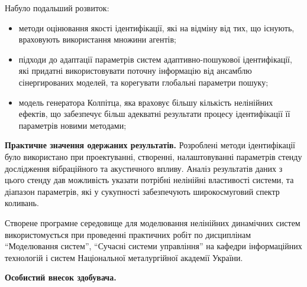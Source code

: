 \documentclass[a4paper,13pt]{atuaref}
\begin{document}
\noindent
Набуло подальший розвиток:
\begin{itemize}

  \item
  методи оцінювання якості ідентифікації,
  які на відміну від тих, що існують,
  враховують використання множини агентів;

  \item
  підходи до адаптації параметрів систем
  адаптивно-пошукової ідентифікації, які придатні використовувати поточну
  інформацію від ансамблю сінергированих моделей, та корегувати глобальні
  параметри пошуку;

  \item
    модель генератора Колпітца, яка враховує
    більшу кількість нелінійних ефектів,
    що забезпечує більш адекватні результати процесу
    ідентифікації її параметрів новими методами;

\end{itemize}


\smallskip
\textbf{Практичне значення одержаних результатів.}
Розроблені методи ідентифікації було використано
при проектуванні, створенні, налаштовуванні параметрів
стенду дослідження вібраційного та акустичного впливу.
Аналіз результатів даних з цього стенду
дав можливість указати потрібні нелінійні властивості системи,
та діапазон параметрів, які у сукупності
забезпечують широкосмуговий спектр коливань.

Створене програмне середовище для моделювання нелінійних динамічних систем
використомується при проведенні практичних робіт по дисциплінам
``Моделювання систем'',
``Сучасні системи управління'' на кафедри інформаційних технологій
і систем Національної металургійної академії України.


\smallskip
\textbf{Особистий внесок здобувача.}
\end{document}

